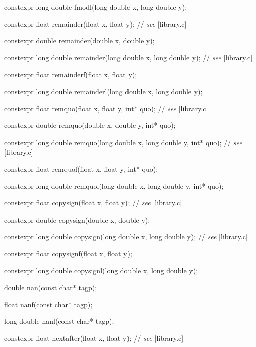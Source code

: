 \documentclass[prd,twocolumn,amsmath,amssymb,nofootinbib,eqsecnum]{revtex4-1}
\newcommand{\highlight}[1]{{\color{green} #1}}
\newcommand{\stdcomment}[1]{{// {\it see} [#1]}}
\begin{document}
{\highlight{constexpr} long double fmodl(long double x, long double y);

\vspace{2ex}

\highlight{constexpr} float remainder(float x, float y); \stdcomment{library.c}

\highlight{constexpr} double remainder(double x, double y);

\highlight{constexpr} long double remainder(long double x, long double y); \stdcomment{library.c}

\highlight{constexpr} float remainderf(float x, float y);

\highlight{constexpr} long double remainderl(long double x, long double y);

\vspace{2ex}

\highlight{constexpr}  float remquo(float x, float y, int* quo); \stdcomment{library.c}

\highlight{constexpr}  double remquo(double x, double y, int* quo);

\highlight{constexpr}  long double remquo(long double x, long double y, int* quo); \stdcomment{library.c}

\highlight{constexpr}  float remquof(float x, float y, int* quo);

\highlight{constexpr}  long double remquol(long double x, long double y, int* quo);

\vspace{2ex}

\highlight{constexpr} float copysign(float x, float y); \stdcomment{library.c}

\highlight{constexpr} double copysign(double x, double y);

\highlight{constexpr} long double copysign(long double x, long double y); \stdcomment{library.c}

\highlight{constexpr} float copysignf(float x, float y);

\highlight{constexpr} long double copysignl(long double x, long double y);

\vspace{2ex}

double nan(const char* tagp);

float nanf(const char* tagp);

long double nanl(const char* tagp);

\vspace{2ex}

\highlight{constexpr}  float nextafter(float x, float y); \stdcomment{library.c}

}
\end{document}
